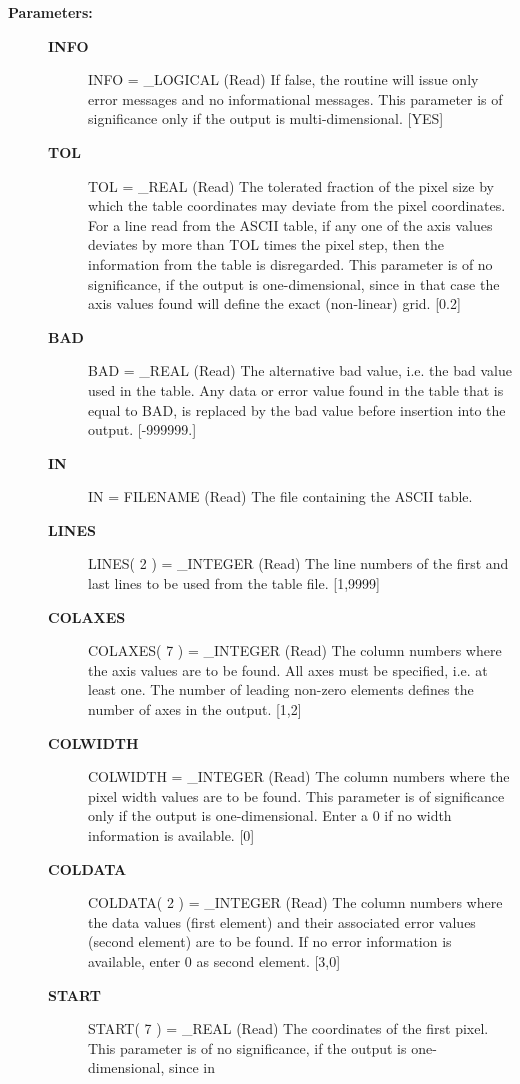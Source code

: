 \begin{description}
\item [\textbf{Parameters:}]
\begin{description}
\item [\textbf{INFO}]
INFO = \_LOGICAL (Read)
   If false, the routine will issue only error messages and no
   informational messages. This parameter is of significance only
   if the output is multi-dimensional. [YES]
\item [\textbf{TOL}]
TOL = \_REAL (Read)
   The tolerated fraction of the pixel size by which the table
   coordinates may deviate from the pixel coordinates. For a line
   read from the ASCII table, if any one of the axis values
   deviates by more than TOL times the pixel step, then the
   information from the table is disregarded. This parameter is of
   no significance, if the output is one-dimensional, since in
   that case the axis values found will define the exact
   (non-linear) grid. [0.2]
\item [\textbf{BAD}]
BAD = \_REAL (Read)
   The alternative bad value, i.e. the bad value used in the
   table. Any data or error value found in the table that is equal
   to BAD, is replaced by the bad value before insertion into the
   output. [-999999.]
\item [\textbf{IN}]
IN = FILENAME (Read)
   The file containing the ASCII table.
\item [\textbf{LINES}]
LINES( 2 ) = \_INTEGER (Read)
   The line numbers of the first and last lines to be used from
   the table file. [1,9999]
\item [\textbf{COLAXES}]
COLAXES( 7 ) = \_INTEGER (Read)
   The column numbers where the axis values are to be found. All
   axes must be specified, i.e. at least one. The number of
   leading non-zero elements defines the number of axes in the
   output. [1,2]
\item [\textbf{COLWIDTH}]
COLWIDTH = \_INTEGER (Read)
   The column numbers where the pixel width values are to be
   found. This parameter is of significance only if the output is
   one-dimensional. Enter a 0 if no width information is
   available. [0]
\item [\textbf{COLDATA}]
COLDATA( 2 ) = \_INTEGER (Read)
   The column numbers where the data values (first element) and
   their associated error values (second element) are to be
   found. If no error information is available, enter 0 as second
   element. [3,0]
\item [\textbf{START}]
START( 7 ) = \_REAL (Read)
   The coordinates of the first pixel. This parameter is of
   no significance, if the output is one-dimensional, since in

\end{description}
\end{description}
